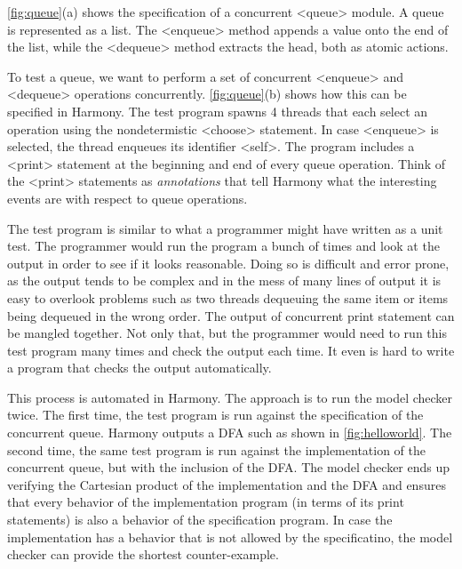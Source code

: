 \documentclass[twocolumn]{article}
\begin{document}
\autoref{fig:queue}(a) shows the specification of a concurrent
<{queue}> module.  A queue is represented as a list.
The <{enqueue}> method appends a value onto the end of the list,
while the <{dequeue}> method extracts the head, both as atomic actions.

To test a queue, we want to perform a set of concurrent <{enqueue}>
and <{dequeue}> operations concurrently.
\autoref{fig:queue}(b) shows how this can be specified in Harmony.
The test program spawns 4 threads that each select an operation
using the nondetermistic <{choose}> statement.  In case <{enqueue}>
is selected, the thread enqueues its identifier <{self}>.  The program
includes a <{print}> statement at the beginning and end of every queue
operation.  Think of the <{print}> statements as \emph{annotations}
that tell Harmony what the interesting events are with respect to
queue operations.

The test program is similar to what a programmer might have written
as a unit test.  The programmer would run the program a bunch of
times and look at the output in order to see if it looks reasonable.
Doing so is difficult and error prone, as the output tends
to be complex and in the mess of many lines of output it is easy
to overlook problems such as two threads dequeuing the same item
or items being dequeued in the wrong order.  The output of concurrent
print statement can be mangled together.  Not only that, but the
programmer would need to run this test program many times and check
the output each time.  It even is hard to write a program that
checks the output automatically.

This process is automated in Harmony.  The approach is to
run the model checker twice.  The first time, the test program is
run against the specification of the concurrent queue.  Harmony
outputs a DFA such as shown in \autoref{fig:helloworld}.  The second
time, the same test program is run against the implementation of the
concurrent queue, but with the inclusion of the DFA.  The model
checker ends up verifying the Cartesian product of the implementation
and the DFA and ensures that every behavior of the implementation
program (in terms of its print statements) is also a behavior of
the specification program.  In case the implementation has a behavior
that is not allowed by the specificatino, the model checker can
provide the shortest counter-example.
\end{document}
